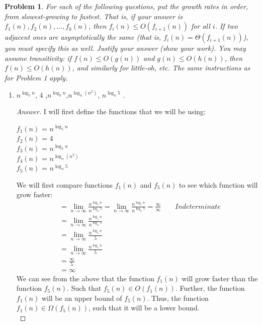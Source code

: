 \documentclass[11pt]{article}
\theoremstyle{definition}
\theoremstyle{definition}
\newtheorem{required}{Problem}
\theoremstyle{definition}
\begin{document}
\begin{required}



    {\itshape For each of the following questions, put the growth rates in order, from slowest-growing to fastest. That is, if your answer is $f_1(n), f_2(n), \dotsc, f_k(n)$, then $f_i(n) \leq O(f_{i+1}(n))$ for all $i$. If two adjacent ones are asymptotically the same (that is, $f_i(n) = \Theta(f_{i+1}(n))$), you must specify this as well. 
    Justify your answer (show your work). You may assume transitivity: if $f(n) \leq O(g(n))$ and $g(n) \leq O(h(n))$, then $f(n) \leq O(h(n))$, and similarly for little-oh, etc. The same instructions as for Problem 1 apply.}
    \begin{enumerate}[label=(\alph*)]
\subsection{Problem 13\ref{2a}}
        \item \label{2a} $n^{\log_5 n}$, \qquad $4$ ,\qquad $n^{\log_3 n}$,\qquad  $n^{\log_n(n^2)}$, \qquad $ n^{\log_n 5}$ .
        \begin{proof}[Answer]
I will first define the functions that we will be using:
\begin{center}
$f_1(n)$ = $n^{\log_5 n}$ \\
$f_2(n)$ = 4 \\
$f_3(n)$ = $n^{\log_3 n}$ \\
$f_4(n)$ = $n^{\log_n(n^2)}$ \\
$f_5(n)$ = $ n^{\log_n 5}$ \\
\end{center}

We will first compare functions $f_1(n)$ and $f_5(n)$ to see which function will grow faster: \\
\begin{align*}
&= \lim_{n \to \infty} \frac{n^{\log_5 n}}{n^{\log_n 5}} = \lim_{n \to \infty} \frac{n^{\log_5 n}}{n^{\log_n 5}}  = \frac{\infty}{\infty} \qquad Indeterminate  \\
&= \lim_{n \to \infty} \frac{n^{\log_5 n}}{n^{\log_n 5}}\\
&= \lim_{n \to \infty} \frac{n^{\log_5 n}}{5}\\
&= \lim_{n \to \infty} \frac{n^{\log_5 n}}{5}\\
&= \frac {\infty}{5} \\
&= \infty
\end{align*} 
We can see from the above that the function $f_1(n)$ will grow faster than the function $f_5(n)$. Such that $f_5(n) \in O(f_1(n))$. Further, the function $f_1(n)$ will be an upper bound of $f_5(n)$. Thus, the function $f_1(n) \in \Omega(f_5(n))$, such that it will be a lower bound. \\


\end{proof}
\end{enumerate}
\end{required}
\end{document}
